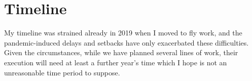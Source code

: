 \documentclass[12pt,onecolumn,twoside]{article}
\begin{document}
	\section{Timeline}
	My timeline was strained already in 2019 when I moved to fly work, and the pandemic-induced delays and setbacks have only exacerbated these difficulties. Given the circumstances, while we have planned several lines of work, their execution will need at least a further year's time which I hope is not an unreasonable time period to suppose.

	
	
\end{document}
